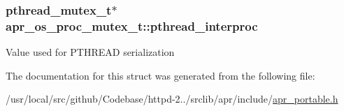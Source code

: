 \subsubsection[{\texorpdfstring{pthread\+\_\+interproc}{pthread_interproc}}]{\setlength{\rightskip}{0pt plus 5cm}pthread\+\_\+mutex\+\_\+t$\ast$ apr\+\_\+os\+\_\+proc\+\_\+mutex\+\_\+t\+::pthread\+\_\+interproc}\hypertarget{structapr__os__proc__mutex__t_aed588bef2efc836e5a768f32638e89c1}{}\label{structapr__os__proc__mutex__t_aed588bef2efc836e5a768f32638e89c1}
Value used for P\+T\+H\+R\+E\+AD serialization 

The documentation for this struct was generated from the following file\+:\begin{DoxyCompactItemize}
\item 
/usr/local/src/github/\+Codebase/httpd-\/2../srclib/apr/include/\hyperlink{apr__portable_8h}{apr\+\_\+portable.\+h}\end{DoxyCompactItemize}
